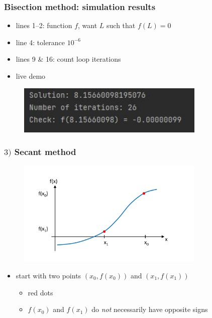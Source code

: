\documentclass[english,14pt]{beamer}
\newcommand\red[1]{{\color{red} #1}}
\begin{document}

\begin{frame}[fragile]

\frametitle{Bisection method: simulation results}

\begin{itemize}
	\item lines 1--2: function $f$, want $L$ such that $f(L)=0$
	\item line 4: tolerance $10^{-6}$
	\item lines 9 \& 16: count loop iterations
	\item live demo
\end{itemize}

\begin{figure}[ht]
	\centering
	\includegraphics[width=0.8\textwidth]{figures/bisectionOutput}
\end{figure}

\end{frame}


\begin{frame}[fragile]

\frametitle{$3)$ Secant method}

\vspace*{-15mm}
\begin{figure}[ht]
	\centering
	\includegraphics[width=0.8\textwidth]{figures/secant1}
\end{figure}
\vspace*{-10mm}
\begin{itemize}
	\item start with two points $(x_0,f(x_0))$ and $(x_1,f(x_1))$
	\begin{itemize}
		\item \red{red dots}
		\item $f(x_0)$ and $f(x_1)$ do \emph{not} necessarily have opposite signs
	\end{itemize}
\end{itemize}

\end{frame}
\end{document}
